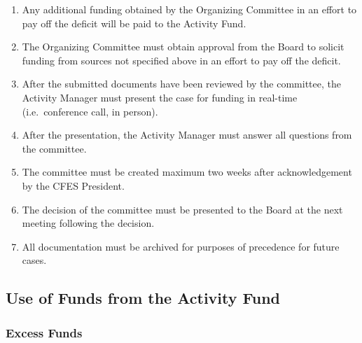 \begin{enumerate}
\begin{enumerate}
\begin{enumerate}
    \end{enumerate}
  \end{enumerate}
 \item
  Any additional funding obtained by the Organizing Committee in an effort to pay off the deficit will be paid to the Activity Fund.
 \item
  The Organizing Committee must obtain approval from the Board to solicit funding from sources not specified above in an effort to pay off the deficit.
 \item
  After the submitted documents have been reviewed by the committee, the Activity Manager must present the case for funding in real-time (i.e.~conference call, in person).
 \item
  After the presentation, the Activity Manager must answer all questions from the committee.
 \item
  The committee must be created maximum two weeks after acknowledgement by the CFES President.
 \item
  The decision of the committee must be presented to the Board at the next meeting following the decision.
 \item
  All documentation must be archived for purposes of precedence for future cases.

\end{enumerate}

\subsection{Use of Funds from the Activity Fund}
\label{use-of-funds-from-the-activity-fund}

\subsubsection{Excess Funds}
\label{excess-funds}

